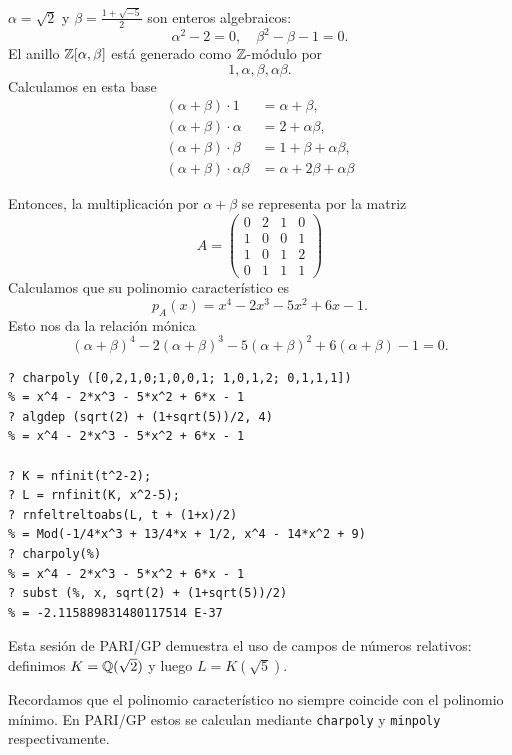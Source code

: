 \begin{ejemplo}
  $\alpha = \sqrt{2}$ y $\beta = \frac{1 + \sqrt{-5}}{2}$ son enteros
  algebraicos:
  \[ \alpha^2 - 2 = 0, \quad
     \beta^2 - \beta - 1 = 0. \]
  El anillo $\mathbb{Z} [\alpha,\beta]$ está generado como $\mathbb{Z}$-módulo por
  $$1, \alpha, \beta, \alpha\beta.$$
  Calculamos en esta base
  \begin{align*}
    (\alpha+\beta) \cdot 1 & = \alpha + \beta,\\
    (\alpha+\beta) \cdot \alpha & = 2 + \alpha\beta,\\
    (\alpha+\beta) \cdot \beta & = 1 + \beta + \alpha\beta,\\
    (\alpha+\beta) \cdot \alpha\beta & = \alpha + 2\beta + \alpha\beta
  \end{align*}

  Entonces, la multiplicación por $\alpha+\beta$ se representa por la matriz
  \[ A = \begin{pmatrix}
    0 & 2 & 1 & 0 \\
    1 & 0 & 0 & 1 \\
    1 & 0 & 1 & 2 \\
    0 & 1 & 1 & 1
  \end{pmatrix} \]
  Calculamos que su polinomio característico es
  $$p_A (x) = x^4 - 2x^3 - 5x^2 + 6x - 1.$$
  Esto nos da la relación mónica
  \[ (\alpha+\beta)^4 - 2 (\alpha+\beta)^3 - 5 (\alpha+\beta)^2
       + 6 (\alpha+\beta) - 1 = 0. \]
  \begin{shaded}
\begin{verbatim}
? charpoly ([0,2,1,0;1,0,0,1; 1,0,1,2; 0,1,1,1])
% = x^4 - 2*x^3 - 5*x^2 + 6*x - 1
? algdep (sqrt(2) + (1+sqrt(5))/2, 4)
% = x^4 - 2*x^3 - 5*x^2 + 6*x - 1

? K = nfinit(t^2-2);
? L = rnfinit(K, x^2-5);
? rnfeltreltoabs(L, t + (1+x)/2)
% = Mod(-1/4*x^3 + 13/4*x + 1/2, x^4 - 14*x^2 + 9)
? charpoly(%)
% = x^4 - 2*x^3 - 5*x^2 + 6*x - 1
? subst (%, x, sqrt(2) + (1+sqrt(5))/2)
% = -2.115889831480117514 E-37
\end{verbatim}
  Esta sesión de PARI/GP demuestra el uso de campos de números relativos:
  definimos $K = \mathbb{Q} (\sqrt{2})$ y luego $L = K (\sqrt{5})$.

  Recordamos que el polinomio característico no siempre coincide con
  el polinomio mínimo. En PARI/GP estos se calculan mediante \texttt{charpoly}
  y \texttt{minpoly} respectivamente.
  \end{shaded}
\end{ejemplo}

